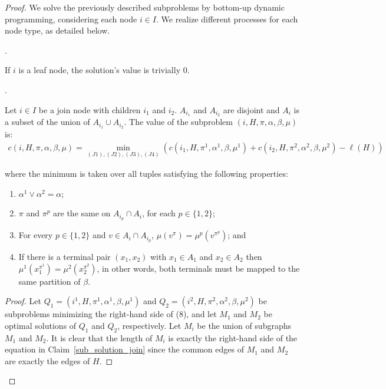 \begin{proof}


We solve the previously described subproblems by bottom-up dynamic programming, considering each node $i \in I$. We realize different processes for each node type, as detailed below.


.

If \(i\) is a leaf node, the solution's value is trivially 0.

.

\begin{claim} \label{sub_solution_join}
    Let $i \in I$ be a join node with children $i_1$ and $i_2$.
    \(A_{i_1}\) and \(A_{i_2}\) are disjoint and \(A_i\) is a subset of the union of \(A_{i_1} \cup A_{i_2}\).
    The value of the subproblem $(i, H, \pi, \alpha, \beta, \mu)$ is:
\begin{align*}
  c(i, H, \pi, \alpha, \beta, \mu) = \min_{(J1), (J2), (J3), (J4)} \left(c(i_1, H, \pi^1, \alpha^1, \beta, \mu^1) + c(i_2, H, \pi^2, \alpha^2, \beta, \mu^2) - \ell(H)\right)
\end{align*}

where the minimum is taken over all tuples satisfying the following properties:

\begin{enumerate}[(J1)]
    \item \(\alpha^1 \vee \alpha^2 = \alpha\);
    \item \(\pi\) and \(\pi^p\) are the same on \(A_{i_p} \cap A_i\), for each \(p  \in \{1, 2\}\);
    \item For every \(p  \in \{1, 2\}\) and \(v \in A_i \cap A_{i_p}\), \(\mu(v^\pi) = \mu^p(v^{\pi^p})\); and
    \item If there is a terminal pair \((x_1, x_2)\) with \(x_1 \in A_1\) and \(x_2 \in A_2\) then \(\mu^1(x_1^{\pi^1}) = \mu^2(x_2^{\pi^2})\), in other words, both terminals must be mapped to the same partition of \(\beta\).
\end{enumerate}

\end{claim}

\begin{proof}
Let \(Q_1 = (i^1, H, \pi^1, \alpha^1, \beta, \mu^1)\) and \(Q_2 = (i^2, H, \pi^2, \alpha^2, \beta, \mu^2)\) be subproblems minimizing the right-hand side of (8), and let \(M_1\) and \(M_2\) be optimal solutions of \(Q_1\) and \(Q_2\), respectively. Let \(M_i\) be the union of subgraphs \(M_1\) and \(M_2\). It is clear that the length of \(M_i\) is exactly the right-hand side of the equation in Claim~\ref{sub_solution_join} since the common edges of \(M_1\) and \(M_2\) are exactly the edges of \(H\).


\end{proof}
\end{proof}
